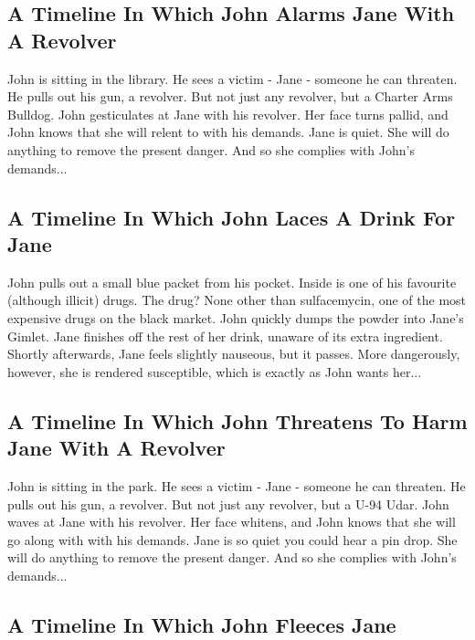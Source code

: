 \documentclass{article}
\begin{document}
\subsection{A Timeline In Which John Alarms Jane With A Revolver}


John is sitting in the library.
He sees a victim {-} Jane {-} someone he can threaten. He pulls out his gun, a revolver.
But not just any revolver, but a Charter Arms Bulldog.
John gesticulates at Jane with his revolver. Her face turns pallid, and John knows that she will relent to with his demands.
Jane is quiet. She will do anything to remove the present danger. And so she complies with John's demands...
\subsection{A Timeline In Which John Laces A Drink For Jane}


John pulls out a small blue packet from his pocket. Inside is one of his favourite (although illicit) drugs.
The drug? None other than sulfacemycin, one of the most expensive drugs on the black market.
John quickly dumps the powder into Jane's Gimlet.
Jane finishes off the rest of her drink, unaware of its extra ingredient.
Shortly afterwards, Jane feels slightly nauseous, but it passes.
More dangerously, however, she is rendered susceptible, which is exactly as John wants her...
\subsection{A Timeline In Which John Threatens To Harm Jane With A Revolver}


John is sitting in the park.
He sees a victim {-} Jane {-} someone he can threaten. He pulls out his gun, a revolver.
But not just any revolver, but a U{-}94 Udar.
John waves at Jane with his revolver. Her face whitens, and John knows that she will go along with with his demands.
Jane is so quiet you could hear a pin drop. She will do anything to remove the present danger. And so she complies with John's demands...
\subsection{A Timeline In Which John Fleeces Jane}
\end{document}
